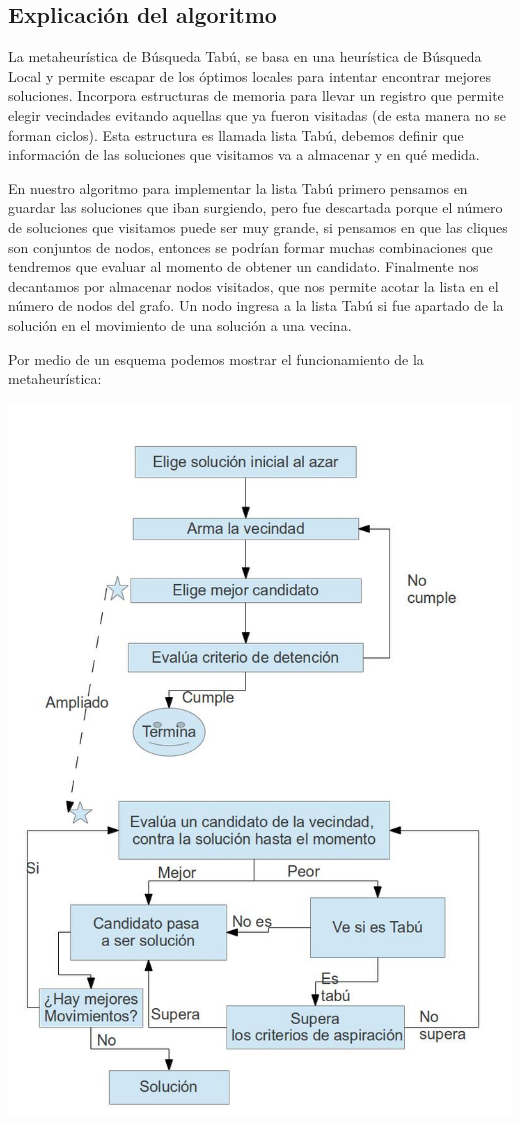 \subsection{Explicaci\'on del algoritmo}
La metaheurística de Búsqueda Tabú, se basa en una heurística de Búsqueda Local y permite escapar de los óptimos locales para intentar encontrar mejores soluciones. Incorpora estructuras de memoria para llevar un registro que permite elegir vecindades evitando aquellas que ya fueron visitadas (de esta manera no se forman ciclos). Esta estructura es llamada lista Tabú, debemos definir que información de las soluciones que visitamos va a almacenar y en qué medida.

En nuestro algoritmo para implementar la lista Tabú primero pensamos en guardar las soluciones que iban surgiendo, pero fue descartada porque el número de soluciones que visitamos puede ser muy grande, si pensamos en que las cliques son conjuntos de nodos, entonces se podrían formar muchas combinaciones que tendremos que evaluar al momento de obtener un candidato.
Finalmente nos decantamos por almacenar nodos visitados, que nos permite acotar la lista en el número de nodos del grafo. Un nodo ingresa a la lista Tabú si fue apartado de la solución en el movimiento de una solución a una vecina. 

Por medio de un esquema podemos mostrar el funcionamiento de la metaheurística:
\begin{center}
\includegraphics[scale=0.3]{tabu/esquema.jpg}
\end{center}

